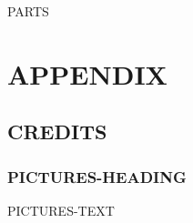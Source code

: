 \documentclass[12pt,fleqn]{book} %
\begin{document}


\pagestyle{empty} %

\tableofcontents %

\cleardoublepage %

\pagestyle{fancy} %

%
%

PARTS



\part{APPENDIX}

\chapter{CREDITS}

\section{PICTURES-HEADING}

PICTURES-TEXT

%
%



\end{document}
